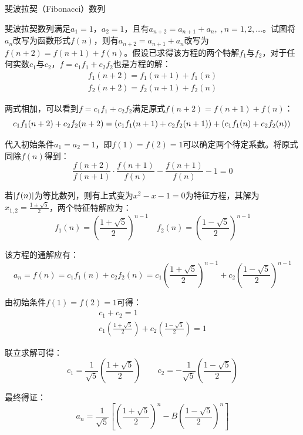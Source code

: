 \documentclass[11pt]{article}
\begin{document}
\begin{example}
    斐波拉契（Fibonacci）数列

    斐波拉契数列满足$a_1=1$，$a_2=1$，且有$a_{n+2} = a_{n+1} + a_{n},\;,n=1,2,\dots$。试图将$a_n$改写为函数形式$f(n)$，则有$a_{n+2} = a_{n+1} + a_{n}$改写为$f(n+2) = f(n+1) + f(n)$。假设已求得该方程的两个特解$f_1$与$f_2$，对于任何实数$c_1$与$c_2$，$f= c_1 f_1 + c_2 f_2$也是方程的解：
    \begin{gather*}
        f_1(n+2) = f_1(n+1) + f_1(n) \\
        f_2(n+2) = f_2(n+1) + f_2(n)
    \end{gather*}

    两式相加，可以看到$f = c_1 f_1 + c_2 f_2$满足原式$f(n+2) = f(n+1) + f(n)$：
    \begin{equation*}
        c_1 f_1(n+2) + c_2 f_2(n+2) = \left( c_1 f_1(n+1) + c_2 f_2(n+1) \right) + \left( c_1 f_1(n)  + c_2 f_2(n) \right) \\
    \end{equation*}

    代入初始条件$a_1=a_2=1$，即$f(1)=f(2)=1$可以确定两个待定系数。将原式同除$f(n)$得到：
    \begin{equation*}
        \frac{f(n+2)}{f(n+1)} \cdot \frac{f(n+1)}{f(n)} - \frac{f(n+1)}{f(n)} - 1 = 0
    \end{equation*}

    若$\left\lvert f(n)\right\rvert$为等比数列，则有上式变为$x^2-x-1=0$为特征方程，其解为$x_{1,2} = \frac{1\pm \sqrt{5}}{2}$，两个特征特解应为：
    \begin{equation*}
        f_1(n) = \left(\frac{1+\sqrt{5}}{2}\right)^{n-1} \quad
        f_2(n) = \left(\frac{1-\sqrt{5}}{2}\right)^{n-1}
    \end{equation*}
   
    该方程的通解应有：
    \begin{equation*}
        a_n = f(n) = c_1 f_1(n) + c_2 f_2(n) = 
        c_1 \left(\frac{1+\sqrt{5}}{2} \right)^{n-1} + c_2 \left( \frac{1-\sqrt{5}}{2} \right)^{n-1}
    \end{equation*}
    
    由初始条件$f(1)=f(2)=1$可得：
    \begin{gather*}
        c_1 + c_2 = 1 \\
        c_1 \left(\frac{1+\sqrt{5}}{2} \right) + c_2 \left( \frac{1-\sqrt{5}}{2} \right) = 1
    \end{gather*}
    
    联立求解可得：
    \begin{equation*}
        c_1 = \frac{1}{\sqrt{5}} \left(\frac{1+\sqrt{5}}{2} \right) \qquad
        c_2 = - \frac{1}{\sqrt{5}} \left(\frac{1-\sqrt{5}}{2} \right)
    \end{equation*}
    
    最终得证：
    \begin{equation*}
        a_n = \frac{1}{\sqrt{5}} \left[ \left(\frac{1+\sqrt{5}}{2} \right)^n - B\left( \frac{1-\sqrt{5}}{2} \right)^n \right]
    \end{equation*}
\end{example}
\end{document}
